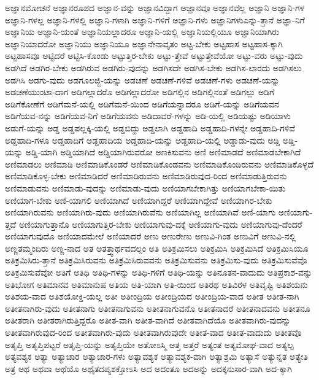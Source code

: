 {ಅಜ್ಞಾನಮೋಚನೆ
ಅಜ್ಞಾನರೂಪದ
ಅಜ್ಞಾನ-ವನ್ನು
ಅಜ್ಞಾನವಿದ್ದಾಗ
ಅಜ್ಞಾನವೂ
ಅಜ್ಞಾನವೆಲ್ಲ
ಅಜ್ಞಾನಿ
ಅಜ್ಞಾನಿ-ಗಳ
ಅಜ್ಞಾನಿ-ಗಳಲ್ಲ
ಅಜ್ಞಾನಿ-ಗಳಲ್ಲಿ
ಅಜ್ಞಾನಿ-ಗಳಾಗಿ
ಅಜ್ಞಾನಿ-ಗಳಿಗೆ
ಅಜ್ಞಾನಿ-ಗಳು
ಅಜ್ಞಾನಿಗಳುಎನ್ನು-ತ್ತಾನೆ
ಅಜ್ಞಾ-ನಿಗೆ
ಅಜ್ಞಾನಿಯ
ಅಜ್ಞಾನಿ-ಯಂತೆ
ಅಜ್ಞಾನಿಯಲ್ಲಾದರೂ
ಅಜ್ಞಾನಿ-ಯಲ್ಲಿ
ಅಜ್ಞಾನಿಯಲ್ಲಿಯೂ
ಅಜ್ಞಾನಿಯಾಗಿರು
ಅಜ್ಞಾನಿಯಾದರೋ
ಅಜ್ಞಾನಿಯು
ಅಜ್ಞಾನಿಯೂ
ಅಜ್ಞಾನೇನಾವೃತಂ
ಅಟ್ಟ-ಬೇಕು
ಅಟ್ಟಹಾಸ
ಅಟ್ಟಹಾಸ-ಕ್ಕಾಗಿ
ಅಟ್ಟಹಾಸವೂ
ಅಟ್ಟಿದರೆ
ಅಟ್ಟಿಸಿ-ಕೊಂಡು
ಅಟ್ಟುತ್ತಿರ-ಬೇಕು
ಅಟ್ಟು-ತ್ತೇವೆ
ಅಟ್ಟುತ್ತೇವೆಯೋ
ಅಟ್ಟು-ವರು
ಅಟ್ಟು-ವುದು
ಅಡಗಿದೆ
ಅಡಗಿರ-ಬೇಕು
ಅಡಗಿರುವ
ಅಡಗಿರು-ವುದನ್ನು
ಅಡಗಿಸದೇ
ಅಡಗಿಸ-ಬೇಕು
ಅಡಗಿಸ-ಲಾರದು
ಅಡಗಿಸಲು
ಅಡಗಿಸಿ
ಅಡಗು-ವುದು
ಅಡಗೂಲಜ್ಜಿ-ಯನ್ನು
ಅಡಚಣೆ
ಅಡಚಣೆ-ಗಳಿವೆ
ಅಡಚಣೆ-ಗಳು
ಅಡಚಣೆ-ಯನ್ನು
ಅಡಚಣೆಯುಂಟಾ-ದಾಗ
ಅಡಿಗಲ್ಲಾದರೊ
ಅಡಿಗಲ್ಲಾದರೋ
ಅಡಿಗಲ್ಲಿನ
ಅಡಿಗಲ್ಲಿನಂತೆ
ಅಡಿಗಲ್ಲು
ಅಡಿಗೆ
ಅಡಿಗೆಕೋಣೆಗೆ
ಅಡಿಗೆಮನೆ-ಯಲ್ಲಿ
ಅಡಿಗೆಮನೆ-ಯಿಂದ
ಅಡಿಗೆಯನ್ನಾದರೂ
ಅಡಿಗೆ-ಯನ್ನು
ಅಡಿಗೆಯವನ
ಅಡಿಗೆಯವ-ನನ್ನು
ಅಡಿಗೆಯವ-ನಿಗೆ
ಅಡಿಗೆಯವನು
ಅಡಿದಾವರೆ-ಗಳನ್ನು
ಅಡಿ-ಯಲ್ಲಿ
ಅಡಿಯಷ್ಟು
ಅಡಿಯಾಳು
ಅಡುಗೆ-ಯನ್ನು
ಅಡ್ಡ
ಅಡ್ಡಪಲ್ಲಕ್ಕಿ-ಯಲ್ಲಿ
ಅಡ್ಡಬಿದ್ದು
ಅಡ್ಡಲಾಗಿ
ಅಡ್ಡಹಾದಿ
ಅಡ್ಡಹಾದಿ-ಗಳನ್ನೇ
ಅಡ್ಡಹಾದಿ-ಗಳಿವೆ
ಅಡ್ಡಹಾದಿ-ಗಳೂ
ಅಡ್ಡಹಾದಿಗೆ
ಅಡ್ಡಹಾದಿಯ
ಅಡ್ಡಹಾದಿ-ಯನ್ನು
ಅಡ್ಡಹಾದಿ-ಯಲ್ಲಿ
ಅಡ್ಡಾಡು-ವುದು
ಅಡ್ಡಿ
ಅಡ್ಡಿ-ಯನ್ನು
ಅಡ್ಡಿ-ಯಾಗಿ
ಅಡ್ಡಿಯಾಗಿದೆ
ಅಡ್ಡಿಯಾಗಿರುವರೋ
ಅಣಕಿಸುವನು
ಅಣಿ
ಅಣಿಮಾಡದೆ
ಅಣಿಮಾಡಬೇಕಾಗಿದೆ
ಅಣಿಮಾಡಲು
ಅಣಿಮಾಡಿ
ಅಣಿಮಾಡಿಕೊಂಡರೆ
ಅಣಿಮಾಡಿಕೊಂಡವನು
ಅಣಿಮಾಡಿಕೊಂಡಿರುವನು
ಅಣಿಮಾಡಿಕೊಳ್ಳದೆ
ಅಣಿಮಾಡಿಕೊಳ್ಳ-ಬೇಕು
ಅಣಿಮಾಡಿದರೆ
ಅಣಿಮಾಡಿರುವನು
ಅಣಿಮಾಡಿರುವುದ-ರಿಂದ
ಅಣಿಮಾಡುತ್ತಿರುವನು
ಅಣಿಮಾಡುವನು
ಅಣಿಮಾಡು-ವುದನ್ನು
ಅಣಿಮಾಡು-ವುದು
ಅಣಿಯಾಗಬೇಕಾಗಿತ್ತು
ಅಣಿಯಾಗಬೇಕಾ-ಯಿತು
ಅಣಿಯಾಗ-ಬೇಕು
ಅಣಿ-ಯಾಗಲಿ
ಅಣಿಯಾಗಿದೆ
ಅಣಿಯಾಗಿದ್ದರೆ
ಅಣಿಯಾಗಿದ್ದೇವೆ
ಅಣಿಯಾಗಿರ-ಬೇಕು
ಅಣಿಯಾಗಿರುವನು
ಅಣಿಯಾಗಿರು-ವುದು
ಅಣಿಯಾಗಿರುವೆನು
ಅಣಿಯಾಗಿಲ್ಲ
ಅಣಿಯಾಗಿವೆ
ಅಣಿ-ಯಾಗು
ಅಣಿಯಾಗು-ತ್ತದೆ
ಅಣಿಯಾಗುತ್ತಾನೊ
ಅಣಿಯಾಗುತ್ತಿರ-ಬೇಕು
ಅಣಿಯಾಗುವು-ದಕ್ಕೆ
ಅಣಿಯಾಗು-ವುದು
ಅಣಿಯಾಗುವು-ದೆಂದರೆ
ಅಣಿಯಾಗುವುದೊ
ಅಣಿಯಾದಮೇಲೆ
ಅಣಿಯಾದರೆ
ಅಣು
ಅಣುರೇಣು
ಅಣುವಿ-ಗಿಂತ
ಅಣುವಿಗೆ
ಅಣುವಿ-ನಲ್ಲಿ
ಅಣ್ಣತಮ್ಮಂದಿರು
ಅಣ್ಣ-ನಾದ
ಅತ
ಅತತ್ತ್ವಾರ್ಥವದಲ್ಪಂ
ಅತಿ
ಅತಿಕ್ರಮಿಸಲು
ಅತಿಕ್ರಮಿಸಿ
ಅತಿಕ್ರಮಿಸಿದೆ
ಅತಿಕ್ರಮಿಸಿಯೂ
ಅತಿಕ್ರಮಿಸಿರು-ತ್ತಾನೆ
ಅತಿಕ್ರಮಿಸಿರುವನು
ಅತಿಕ್ರಮಿಸಿರುವವನು
ಅತಿಕ್ರಮಿಸುವನು
ಅತಿಕ್ರಮಿಸು-ವುದು
ಅತಿಕ್ರಮಿಸುವೆವೊ
ಅತಿಕ್ರಮಿಸುವೆವೋ
ಅತಿಗೆ
ಅತಿಥಿ
ಅತಿಥಿ-ಗಳನ್ನು
ಅತಿಥಿ-ಗಳಿಗೆ
ಅತಿಥಿ-ಯನ್ನು
ಅತಿನೂತನ-ವಾದುದು
ಅತಿಪ್ರಕಾಶ-ವನ್ನು
ಅತಿಭೋಗ
ಅತಿಮಾನವ
ಅತಿಮಾನುಷ
ಅತಿಯ
ಅತಿ-ಯಾಗಿ
ಅತಿ-ಯಿಂದ
ಅತಿರಥ
ಅತಿವಿರಳ
ಅತಿವೃಷ್ಟಿ
ಅತಿಶಯನು
ಅತಿಶಯ-ವಾದ
ಅತಿಶಯೋಕ್ತಿ-ಯಲ್ಲ
ಅತೀ
ಅತೀಂದ್ರಿಯ
ಅತೀಂದ್ರಿಯದ
ಅತೀಂದ್ರಿಯ-ವಾದ
ಅತೀತ
ಅತೀತ-ನಾಗಿ
ಅತೀತನಾಗಿರು-ವುದು
ಅತೀತನಾಗು
ಅತೀತನಾಗುವನು
ಅತೀತನಾಗುವನೊ
ಅತೀತನಾದರೆ
ಅತೀತನಾದವನು
ಅತೀತನೂ
ಅತೀತರಾಗಿ
ಅತೀತರಾಗಿರುತ್ತಿದ್ದರೊ
ಅತೀತ-ವಾಗಿ
ಅತೀತ-ವಾಗಿದೆ
ಅತೀತವಾಗಿದೆಯೊ
ಅತೀತವಾಗಿರು-ವುದನ್ನು
ಅತೀತವಾಗಿರುವುದ-ರಿಂದ
ಅತೀತವಾಗಿರು-ವುದು
ಅತೀತವಾಗಿರುವುದೇ
ಅತೀತ-ವಾದ
ಅತೀತ-ವಾದುದು
ಅತೀತವೊ
ಅತೃಪ್ತಿ
ಅತೃಪ್ತಿಪಟ್ಟರೆ
ಅತೃಪ್ತಿ-ಯನ್ನು
ಅತೃಪ್ತಿಯೇ
ಅತೋಽಸ್ಮಿ
ಅತ್ತ
ಅತ್ತರೆ
ಅತ್ಯಂತ
ಅತ್ಯಮೋಘ-ವಾದ
ಅತ್ಯಲ್ಪ
ಅತ್ಯವಶ್ಯಕ
ಅತ್ಯಾ
ಅತ್ಯಾಚಾರ
ಅತ್ಯಾಚಾರ-ಗಳು
ಅತ್ಯಾವಶ್ಯಕ
ಅತ್ಯಾವಶ್ಯಕ-ವಾಗಿ
ಅತ್ಯಾಶ್ರಮಿ
ಅತ್ಯಾಸೆ
ಅತ್ಯುನ್ನತ
ಅತ್ಯೇತಿ
ಅತ್ರ
ಅಥ
ಅಥವಾ
ಅಥೆಯೊ
ಅಥೈತದಪ್ಯಶಕ್ತೋಽಸಿ
ಅದ
ಅದಂತೂ
ಅದಅನ್ನು
ಅದಕ್ಕನುಸಾರ-ವಾಗಿ
ಅದ-ಕ್ಕಾಗಿ
}
